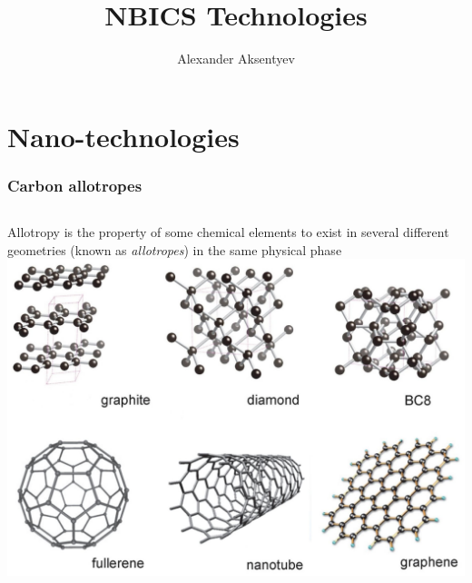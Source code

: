 \documentclass{beamer}
\title{NBICS Technologies}
\author{Alexander Aksentyev}
\institute{National Research Nuclear University ``MEPhI''}
\date{}
\begin{document}
	\begin{frame}
		\titlepage
	\end{frame}

\section{Nano-technologies}

\begin{frame}
	\frametitle{Carbon allotropes}
	\begin{columns}
		\column{.4\textwidth}
		Allotropy is the property of some chemical elements to exist in several different geometries (known as \emph{allotropes}) in the same physical phase
		\column{.6\textwidth}
		\includegraphics[scale=.45]{CarbAllotropes}
	\end{columns}
\end{frame}
\end{document}
